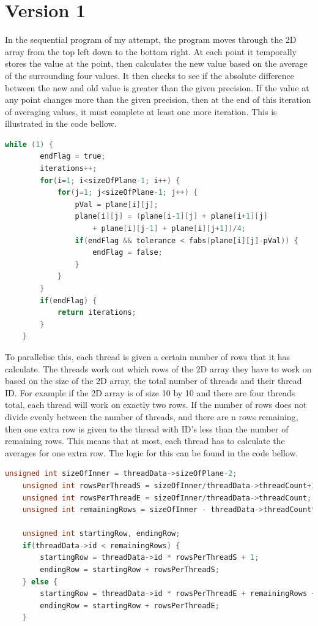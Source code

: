 \documentclass{report}
\begin{document}
\section{Version 1}
In the sequential program of my attempt, the program moves through the 2D array from the top left down to the bottom right. At each point it temporally stores the value at the point, then calculates the new value based on the average of the surrounding four values. It then checks to see if the absolute difference between the new and old value is greater than the given precision. If the value at any point changes more than the given precision, then at the end of this iteration of averaging values, it must complete at least one more iteration. This is illustrated in the code bellow.
\begin{lstlisting}[language=C,
    keywordstyle=\color{blue},
    commentstyle=\color{magenta}\itshape,
    emphstyle=\color{red},
    breaklines,
    basicstyle=\ttfamily,
    stringstyle=\color{green},
    identifierstyle=\color{cyan}
    ]
    while (1) {
        endFlag = true;
        iterations++;
        for(i=1; i<sizeOfPlane-1; i++) {
            for(j=1; j<sizeOfPlane-1; j++) {
                pVal = plane[i][j];
                plane[i][j] = (plane[i-1][j] + plane[i+1][j]
                    + plane[i][j-1] + plane[i][j+1])/4;
                if(endFlag && tolerance < fabs(plane[i][j]-pVal)) {
                    endFlag = false;
                }
            }
        }
        if(endFlag) {
            return iterations;
        }
    }
\end{lstlisting}
To parallelise this, each thread is given a certain number of rows that it has calculate. The threads work out which rows of the 2D array they have to work on based on the size of the 2D array, the total number of threads and their thread ID. For example if the 2D array is of size 10 by 10 and there are four threads total, each thread will work on exactly two rows. If the number of rows does not divide evenly between the number of threads, and there are n rows remaining, then one extra row is given to the thread with ID's less than the number of remaining rows. This means that at most, each thread has to calculate the averages for one extra row. The logic for this can be found in the code bellow.
\begin{lstlisting}[language=C,
    keywordstyle=\color{blue},
    commentstyle=\color{magenta}\itshape,
    emphstyle=\color{red},
    breaklines,
    basicstyle=\ttfamily,
    stringstyle=\color{green},
    identifierstyle=\color{cyan}
    ]
    unsigned int sizeOfInner = threadData->sizeOfPlane-2;
    unsigned int rowsPerThreadS = sizeOfInner/threadData->threadCount+1;
    unsigned int rowsPerThreadE = sizeOfInner/threadData->threadCount;
    unsigned int remainingRows = sizeOfInner - threadData->threadCount*rowsPerThreadE;

    unsigned int startingRow, endingRow;
    if(threadData->id < remainingRows) {
        startingRow = threadData->id * rowsPerThreadS + 1;
        endingRow = startingRow + rowsPerThreadS;
    } else {
        startingRow = threadData->id * rowsPerThreadE + remainingRows + 1;
        endingRow = startingRow + rowsPerThreadE;
    }
\end{lstlisting}
\end{document}
